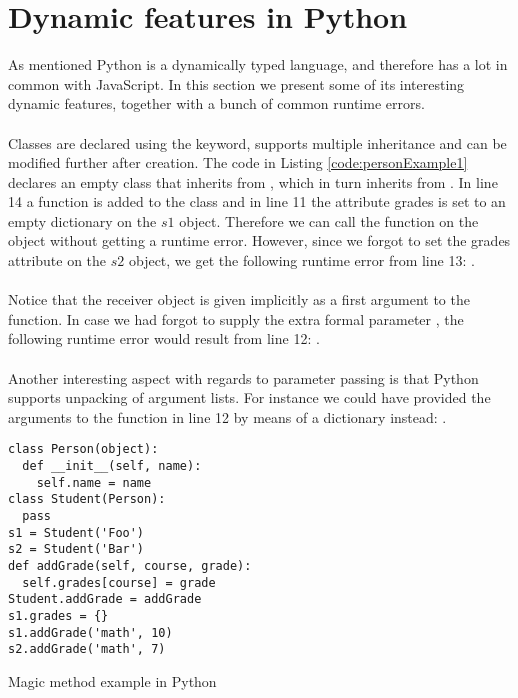 \chapter{Dynamic features in Python}
As mentioned Python is a dynamically typed language, and therefore has a lot in common with JavaScript. In this section we present some of its interesting dynamic features, together with a bunch of common runtime errors. \\
\\
Classes are declared using the  keyword, supports multiple inheritance and can be modified further after creation. The code in  Listing \ref{code:personExample1} declares an empty  class that inherits from , which in turn inherits from . In line 14 a function  is added to the  class and in line 11 the attribute grades is set to an empty dictionary on the $s1$ object. Therefore we can call the  function on the  object without getting a runtime error. However, since we forgot to set the grades attribute on the $s2$ object, we get the following runtime error from line 13: . \\
\\
Notice that the receiver object is given implicitly as a first argument to the  function. In case we had forgot to supply the extra formal parameter , the following runtime error would result from line 12: . \\
\\
Another interesting aspect with regards to parameter passing is that Python supports unpacking of argument lists. For instance we could have provided the arguments to the  function in line 12 by means of a dictionary instead: .


\begin{listing}[H]
	\begin{verbatim}
class Person(object):
  def __init__(self, name):
    self.name = name
class Student(Person):
  pass
s1 = Student('Foo')
s2 = Student('Bar')
def addGrade(self, course, grade):
  self.grades[course] = grade
Student.addGrade = addGrade
s1.grades = {}
s1.addGrade('math', 10)
s2.addGrade('math', 7)
	\end{verbatim}
	\caption{Magic method example in Python}\label{code:personExample1}
\end{listing}

